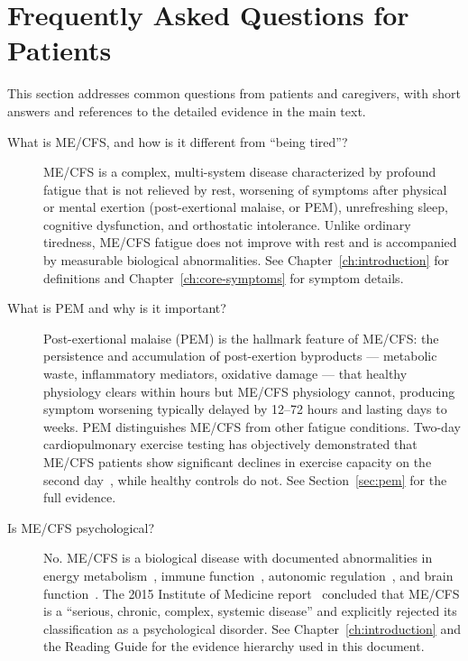 \chapter*{Frequently Asked Questions for Patients}
\label{ch:patient-faq}

This section addresses common questions from patients and caregivers, with
short answers and references to the detailed evidence in the main text.

\begin{description}

\item[What is ME/CFS, and how is it different from ``being tired''?]
ME/CFS is a complex, multi-system disease characterized by profound fatigue
that is not relieved by rest, worsening of symptoms after physical or mental
exertion (post-exertional malaise, or PEM), unrefreshing sleep, cognitive
dysfunction, and orthostatic intolerance. Unlike ordinary tiredness, ME/CFS
fatigue does not improve with rest and is accompanied by measurable biological
abnormalities. See Chapter~\ref{ch:introduction} for definitions and
Chapter~\ref{ch:core-symptoms} for symptom details.

\item[What is PEM and why is it important?]
Post-exertional malaise (PEM) is the hallmark feature of ME/CFS: the
persistence and accumulation of post-exertion byproducts --- metabolic waste,
inflammatory mediators, oxidative damage --- that healthy physiology clears
within hours but ME/CFS physiology cannot, producing symptom worsening
typically delayed by 12--72 hours and lasting days to weeks.
PEM distinguishes ME/CFS from other fatigue conditions. Two-day
cardiopulmonary exercise testing has objectively demonstrated that ME/CFS
patients show significant declines in exercise capacity on the second
day~\cite{keller2024cpet}, while healthy controls do not.
See Section~\ref{sec:pem} for the full evidence.

\item[Is ME/CFS psychological?]
No. ME/CFS is a biological disease with documented abnormalities in energy
metabolism~\cite{wang2023wasf3}, immune function~\cite{EatonFitch2019},
autonomic regulation~\cite{VanCampenEtAl2024}, and brain
function~\cite{walitt2024deep}. The 2015 Institute of Medicine
report~\cite{IOM2015} concluded that ME/CFS is a ``serious, chronic, complex,
systemic disease'' and explicitly rejected its classification as a
psychological disorder. See Chapter~\ref{ch:introduction} and the Reading
Guide for the evidence hierarchy used in this document.


\end{description}
